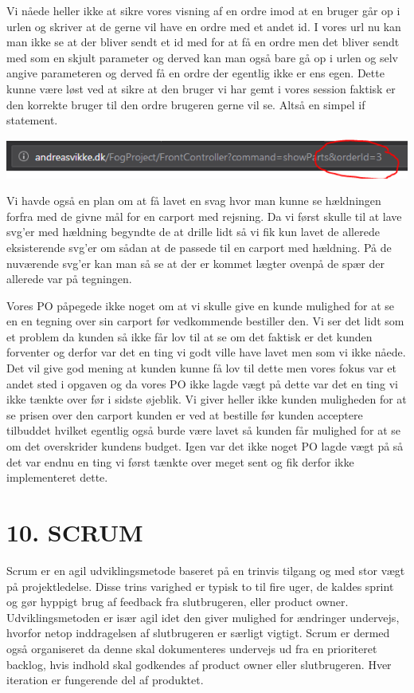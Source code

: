 \documentclass[11pt]{report}
\begin{document}
Vi nåede heller ikke at sikre vores visning af en ordre imod at en
bruger går op i urlen og skriver at de gerne vil have en ordre med et
andet id. I vores url nu kan man ikke se at der bliver sendt et id med
for at få en ordre men det bliver sendt med som en skjult parameter og
derved kan man også bare gå op i urlen og selv angive parameteren og
derved få en ordre der egentlig ikke er ens egen. Dette kunne være
løst ved at sikre at den bruger vi har gemt i vores session faktisk er
den korrekte bruger til den ordre brugeren gerne vil se. Altså en
simpel if statement.\\

\begin{center}
\includegraphics[width=15cm]{Picture1.png}
\end{center}

Vi havde også en plan om at få lavet en svag hvor man kunne se
hældningen forfra med de givne mål for en carport med rejsning. Da vi
først skulle til at lave svg’er med hældning begyndte de at drille
lidt så vi fik kun lavet de allerede eksisterende svg’er om sådan at
de passede til en carport med hældning. På de nuværende svg’er kan man
så se at der er kommet lægter ovenpå de spær der allerede var på
tegningen.
\newpage

\noindent Vores PO påpegede ikke noget om at vi skulle give en kunde mulighed for at se en en tegning over sin carport før vedkommende bestiller den. Vi ser det lidt som et problem da kunden så ikke får lov til at se om det faktisk er det kunden forventer og derfor var det en ting vi godt ville have lavet men som vi ikke nåede. Det vil give god mening at kunden kunne få lov til dette men vores fokus var et andet sted i opgaven og da vores PO ikke lagde vægt på dette var det en ting vi ikke tænkte over før i sidste øjeblik. Vi giver heller ikke kunden muligheden for at se prisen over den carport kunden er ved at bestille før kunden acceptere tilbuddet hvilket egentlig også burde være lavet så kunden får mulighed for at se om det overskrider kundens budget. Igen var det ikke noget PO lagde vægt på så det var endnu en ting vi først tænkte over meget sent og fik derfor ikke implementeret dette.

\newpage

\chapter*{10. SCRUM}
Scrum er en agil udviklingsmetode baseret på en trinvis tilgang og med stor vægt på projektledelse. Disse trins varighed er typisk to til fire uger, de kaldes sprint og gør hyppigt brug af feedback fra slutbrugeren, eller product owner. Udviklingsmetoden er især agil idet den giver mulighed for ændringer undervejs, hvorfor netop inddragelsen af slutbrugeren er særligt vigtigt. Scrum er dermed også organiseret da denne skal dokumenteres undervejs ud fra en prioriteret backlog, hvis indhold skal godkendes af product owner eller slutbrugeren. Hver iteration er fungerende del af produktet.
\end{document}
